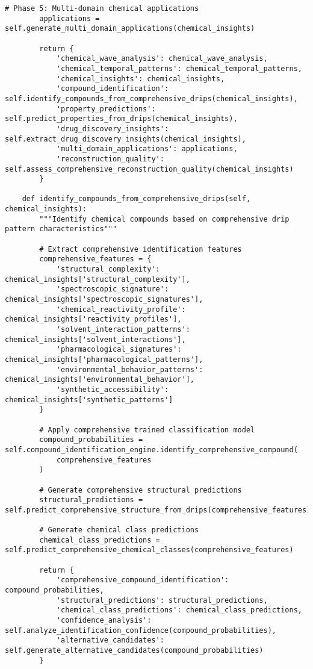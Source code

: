 \documentclass[12pt,a4paper]{article}
\begin{document}
\begin{algorithm}
\begin{algorithmic}[1]
\begin{table}[H]
\begin{lstlisting}[style=pythonstyle, caption=Computer Vision Comprehensive Chemical Pattern Analysis]
        # Phase 5: Multi-domain chemical applications
        applications = self.generate_multi_domain_applications(chemical_insights)
        
        return {
            'chemical_wave_analysis': chemical_wave_analysis,
            'chemical_temporal_patterns': chemical_temporal_patterns,
            'chemical_insights': chemical_insights,
            'compound_identification': self.identify_compounds_from_comprehensive_drips(chemical_insights),
            'property_predictions': self.predict_properties_from_drips(chemical_insights),
            'drug_discovery_insights': self.extract_drug_discovery_insights(chemical_insights),
            'multi_domain_applications': applications,
            'reconstruction_quality': self.assess_comprehensive_reconstruction_quality(chemical_insights)
        }
    
    def identify_compounds_from_comprehensive_drips(self, chemical_insights):
        """Identify chemical compounds based on comprehensive drip pattern characteristics"""
        
        # Extract comprehensive identification features
        comprehensive_features = {
            'structural_complexity': chemical_insights['structural_complexity'],
            'spectroscopic_signature': chemical_insights['spectroscopic_signatures'],
            'chemical_reactivity_profile': chemical_insights['reactivity_profiles'],
            'solvent_interaction_patterns': chemical_insights['solvent_interactions'],
            'pharmacological_signatures': chemical_insights['pharmacological_patterns'],
            'environmental_behavior_patterns': chemical_insights['environmental_behavior'],
            'synthetic_accessibility': chemical_insights['synthetic_patterns']
        }
        
        # Apply comprehensive trained classification model
        compound_probabilities = self.compound_identification_engine.identify_comprehensive_compound(
            comprehensive_features
        )
        
        # Generate comprehensive structural predictions
        structural_predictions = self.predict_comprehensive_structure_from_drips(comprehensive_features)
        
        # Generate chemical class predictions
        chemical_class_predictions = self.predict_comprehensive_chemical_classes(comprehensive_features)
        
        return {
            'comprehensive_compound_identification': compound_probabilities,
            'structural_predictions': structural_predictions,
            'chemical_class_predictions': chemical_class_predictions,
            'confidence_analysis': self.analyze_identification_confidence(compound_probabilities),
            'alternative_candidates': self.generate_alternative_candidates(compound_probabilities)
        }
    

\end{lstlisting}
\end{table}
\end{algorithmic}
\end{algorithm}
\end{document}
